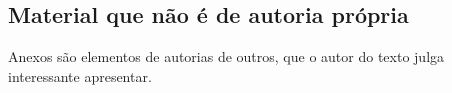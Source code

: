 \documentclass[
	12pt,				%
	openright,			%
	oneside,			%
	a4paper,			%
	english,			%
	brazil				%
	]{abntex2}
\begin{document}
\begin{anexosenv}

\chapter{Material que não é de autoria própria} \label{anexo:A}
Anexos são elementos de autorias de outros, que o autor do texto julga interessante apresentar.

\end{anexosenv}

\end{document}
